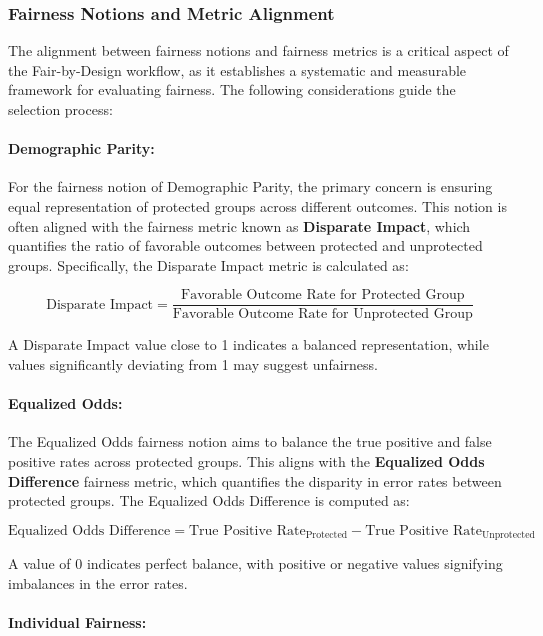 \subsubsection{Fairness Notions and Metric Alignment}

The alignment between fairness notions and fairness metrics is a critical aspect of the Fair-by-Design workflow, as it establishes a systematic and measurable framework for evaluating fairness. The following considerations guide the selection process:

\paragraph{Demographic Parity:}

For the fairness notion of Demographic Parity, the primary concern is ensuring equal representation of protected groups across different outcomes. This notion is often aligned with the fairness metric known as \textbf{Disparate Impact}, which quantifies the ratio of favorable outcomes between protected and unprotected groups. Specifically, the Disparate Impact metric is calculated as:

\[
\text{Disparate Impact} = \frac{\text{Favorable Outcome Rate for Protected Group}}{\text{Favorable Outcome Rate for Unprotected Group}}
\]

A Disparate Impact value close to 1 indicates a balanced representation, while values significantly deviating from 1 may suggest unfairness.

\paragraph{Equalized Odds:}

The Equalized Odds fairness notion aims to balance the true positive and false positive rates across protected groups. This aligns with the \textbf{Equalized Odds Difference} fairness metric, which quantifies the disparity in error rates between protected groups. The Equalized Odds Difference is computed as:

\[
\text{Equalized Odds Difference} = \text{True Positive Rate}_{\text{Protected}} - \text{True Positive Rate}_{\text{Unprotected}}
\]

A value of 0 indicates perfect balance, with positive or negative values signifying imbalances in the error rates.

\paragraph{Individual Fairness:}

